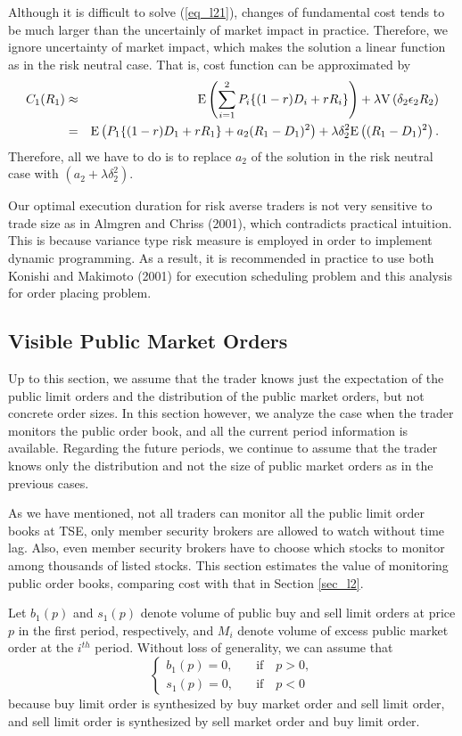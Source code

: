 Although it is difficult to solve (\ref{eq_l21}), changes of fundamental cost tends to be much larger than the uncertainly of market impact in practice.  Therefore, we ignore uncertainty of market impact, which makes the solution a linear function as in the risk neutral case.  That is, cost function can be approximated by 
\begin{eqnarray*}\label{eq_l22}
  C_1(R_1) & \approx & {\mathrm{E}}\left( \sum_{i=1}^2 P_i \{(1-r) D_i +r R_i\} \right)+\lambda {\mathrm{V}}\left( \delta_2 \epsilon_2 R_2 \right) \nonumber \\
      & = & {\mathrm{E}}\left( P_1 \{(1-r) D_1 +r R_1\}+a_2(R_1-D_1)^2 \right)+\lambda \delta_2^2 {\mathrm{E}}\left(  (R_1-D_1)^2 \right).
\end{eqnarray*}
Therefore, all we have to do is to replace $a_2$ of the solution in the risk neutral case with $(a_2+\lambda \delta_2^2)$.

Our optimal execution duration for risk averse traders is not very sensitive to trade size as in Almgren and Chriss (2001), which contradicts practical intuition.  This is because variance type risk measure is employed in order to implement dynamic programming.  As a result, it is recommended in practice to use both Konishi and Makimoto (2001) for execution scheduling problem and this analysis for order placing problem.

\subsection{Visible Public Market Orders}
Up to this section, we assume that the trader knows just the expectation of the public limit orders and the distribution of the public market orders, but not concrete order sizes.  In this section however, we analyze the case when the trader monitors the public order book, and all the current period information is available.  Regarding the future periods, we continue to assume that the trader knows only the distribution and not the size of public market orders as in the previous cases.

As we have mentioned, not all traders can monitor all the public limit order books at TSE, only member security brokers are allowed to watch without time lag.  Also, even member security brokers have to choose which stocks to monitor among thousands of listed stocks.  This section estimates the value of monitoring public order books, comparing cost with that in Section \ref{sec_l2}.  

Let $b_1(p)$ and $s_1(p)$ denote volume of public buy and sell limit orders at price $p$ in the first period, respectively, and $M_i$ denote volume of excess public market order at the $i^{th}$ period.  Without loss of generality, we can assume that 
\[ %
  \left\{
  \begin{array}{ll}
   b_1(p)=0, & \quad \mbox{if} \quad p>0, \\
   s_1(p)=0, & \quad \mbox{if} \quad p<0
  \end{array}
  \right.
\] %
because buy limit order is synthesized by buy market order and sell limit order, and sell limit order is synthesized by sell market order and buy limit order.

